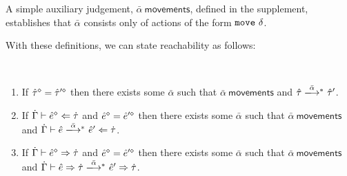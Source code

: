 A simple auxiliary judgement, $\bar\alpha~\mathsf{movements}$, defined in the supplement, establishes that $\bar\alpha$ consists only of actions of the form $\mathtt{move}~\delta$.

With these definitions, we can state reachability as follows:

\begin{theorem}[Reachability]\label{thrm:reachability} ~
\begin{enumerate}[itemsep=0px,partopsep=0px,topsep=0px]
\item If $\hat{\tau}^{\diamond}=\hat{\tau}'^{\diamond}$ then there exists some $\bar\alpha$ such that $\bar{\alpha}~\mathsf{movements}$ and $\performTypI{\ztau}{\bar\alpha}{\ztau'}$.
\item If $\dot{\Gamma} \vdash \hat{e}^{\diamond} \Leftarrow \dot{\tau}$ and $\hat{e}^{\diamond}=\hat{e}'^{\diamond}$ then there exists some $\bar{\alpha}$ such that $\bar{\alpha}~\mathsf{movements}$ and $\performAnaI{\hGamma}{\zexp}{\htau}{\bar{\alpha}}{\zexp'}$. 
\item If $\dot{\Gamma} \vdash \hat{e}^{\diamond} \Rightarrow \dot{\tau}$ and $\hat{e}^{\diamond}=\hat{e}'^{\diamond}$ then there exists some $\bar{\alpha}$ such that $\bar{\alpha}~\mathsf{movements}$ and $\performSynI{\hGamma}{\zexp}{\htau}{\bar\alpha}{\zexp'}{\htau}$.
\end{enumerate}
\end{theorem}


